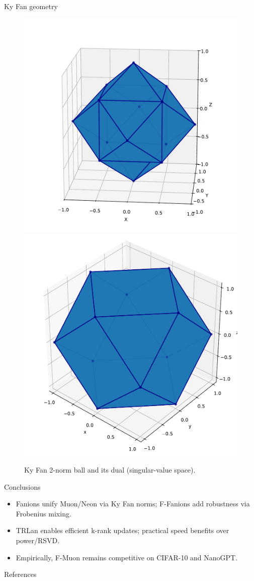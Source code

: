 \documentclass[aspectratio=169]{beamer}
\begin{document}
\begin{frame}{Ky Fan geometry}
  \begin{figure}[t]
    \centering
    \includegraphics[width=0.45\linewidth]{KyFan.pdf}\hfill
    \includegraphics[width=0.45\linewidth]{KyFanDual.pdf}
    \caption{Ky Fan 2-norm ball and its dual (singular-value space).}
  \end{figure}
\end{frame}

\begin{frame}{Conclusions}
  \begin{itemize}
    \item Fanions unify Muon/Neon via Ky Fan norms; F-Fanions add robustness via Frobenius mixing.
    \item TRLan enables efficient k-rank updates; practical speed benefits over power/RSVD.
    \item Empirically, F-Muon remains competitive on CIFAR-10 and NanoGPT.
  \end{itemize}
\end{frame}

\begin{frame}[allowframebreaks]{References}
  \printbibliography
\end{frame}
\end{document}

